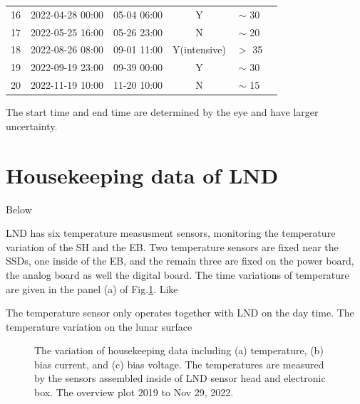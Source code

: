 \begin{table}[!tbhp]
\begin{tabular}{cccccc}
    16      &    2022-04-28 00:00 & 05-04 06:00             & Y  & $\sim$ 30 \\
    17      &   2022-05-25 16:00 & 05-26 23:00             & N  & $\sim$ 20\\
    18      &   2022-08-26 08:00 & 09-01 11:00             & Y(intensive)  & $>$ 35 \\
    19      &   2022-09-19 23:00 & 09-39 00:00             & Y  & $\sim$ 30 \\
    20      &   2022-11-19 10:00 & 11-20 10:00             & N  & $\sim$ 15 \\
    \hline
\end{tabular}
\label{Tab:appendix_LND_SEP_list}
\end{table}

The start time and end time are determined by the eye and have larger uncertainty. 



\section{Housekeeping data of \ac{LND}}

Below

\ac{LND} has six temperature measusment sensors, monitoring the temperature variation of the \ac{SH} and the \ac{EB}. Two temperature sensors are fixed near the \acp{SSD}, one inside of the \ac{EB}, and the remain three are fixed on the power board, the analog board as well the digital board. The time variations of temperature are given in the panel (a) of Fig.\ref{Fig:appendix_LND_Housekeeping}. Like
 
The temperature sensor only operates together with LND on the day time. 
The temperature variation on the lunar surface

\begin{figure}[!htb]
    \centering
    \caption[LND temperature, bias current, and bias voltage variations]{The variation of housekeeping data including (a) temperature, (b) bias current, and (c) bias voltage. The temperatures are measured by the sensors assembled inside of LND sensor head and electronic box. The overview plot  2019 to Nov 29, 2022. }
    \label{Fig:appendix_LND_Housekeeping}
\end{figure}

